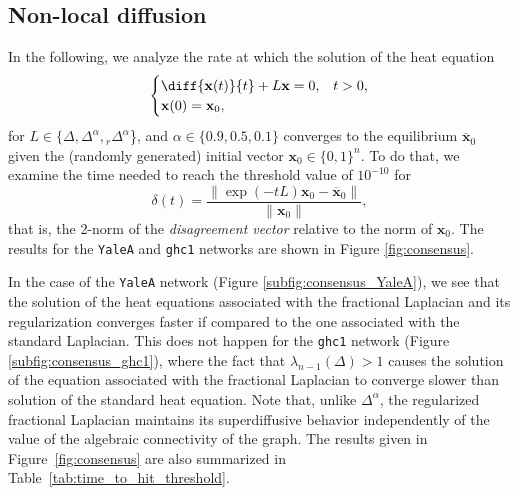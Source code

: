 \documentclass[a4paper,12pt]{article}
\newcommand{\xvec}{\mathbf{x}}
\newcommand{\fL}{\Delta^\alpha}
\newcommand{\rfL}{{}_r\fL}
\begin{document}
\subsection{Non-local diffusion} \label{subsec:experiments_non_local_diffusion}

In the following, we analyze the rate at which the solution of the heat equation
\begin{equation}\label{eq:heat_equation_all_operators}
\begin{cases}
    \diff{\mathbf{x}(t)}{t} +L\mathbf{x}=0, & t>0, \\
    \mathbf{x}(0) = \mathbf{x}_0, 
\end{cases} 
\end{equation}
for $L \in\{\Delta, \fL, \rfL$\}, and $\alpha \in \{0.9, 0.5, 0.1\}$ 
converges to the equilibrium $\overline{\xvec}_{0}$ given the (randomly generated) initial vector $\xvec_0\in\{0,1\}^{n}$. 
To do that, we examine the time needed to reach the threshold value of $10^{-10}$ for
\begin{equation*}
    \delta(t) = \frac {\| \exp(-tL)\mathbf{x}_0 - \overline{\xvec}_0 \| }{\|\xvec_0\|},
\end{equation*}
that is, the 2-norm of the \emph{disagreement vector} relative to the norm of $\xvec_0$. The results for the \texttt{YaleA} and \texttt{ghc1} networks are shown in Figure \ref{fig:consensus}. 

In the case of the \texttt{YaleA} network (Figure \ref{subfig:consensus_YaleA}), we see that the solution of the heat equations associated with the fractional Laplacian and its regularization converges faster if compared to the one associated with the standard Laplacian.  
This does not happen for the \texttt{ghc1} network (Figure \ref{subfig:consensus_ghc1}), where the fact that $\lambda_{n-1}(\Delta)>1$ causes the solution of the equation associated with the fractional Laplacian to converge slower than solution of the standard heat equation.
Note that, unlike $\fL$, the regularized fractional Laplacian maintains its superdiffusive behavior independently of the value of the algebraic connectivity of the graph. The results given in Figure~\ref{fig:consensus} are also summarized in Table~\ref{tab:time_to_hit_threshold}.
\end{document}

